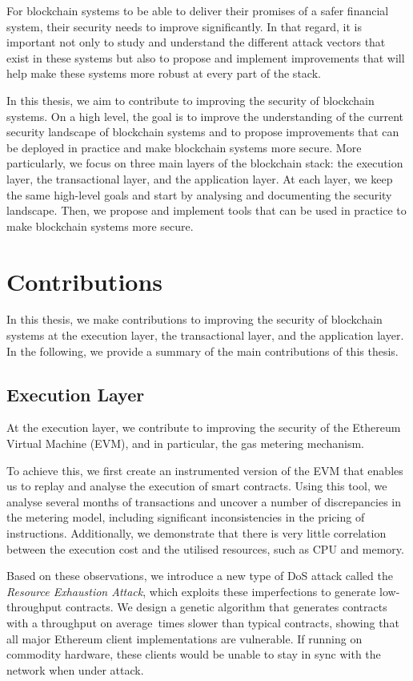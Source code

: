 For blockchain systems to be able to deliver their promises of a safer financial system, their security needs to improve significantly.
In that regard, it is important not only to study and understand the different attack vectors that exist in these systems but also to propose and implement improvements that will help make these systems more robust at every part of the stack.

In this thesis, we aim to contribute to improving the security of blockchain systems.
On a high level, the goal is to improve the understanding of the current security landscape of blockchain systems and to propose improvements that can be deployed in practice and make blockchain systems more secure.
More particularly, we focus on three main layers of the blockchain stack: the execution layer, the transactional layer, and the application layer.
At each layer, we keep the same high-level goals and start by analysing and documenting the security landscape.
Then, we propose and implement tools that can be used in practice to make blockchain systems more secure.

\section{Contributions}

In this thesis, we make contributions to improving the security of blockchain systems at the execution layer, the transactional layer, and the application layer.
In the following, we provide a summary of the main contributions of this thesis.

\subsection{Execution Layer}
At the execution layer, we contribute to improving the security of the Ethereum Virtual Machine (EVM), and in particular, the gas metering mechanism.

To achieve this, we first create an instrumented version of the EVM that enables us to replay and analyse the execution of smart contracts. Using this tool, we analyse several months of transactions and uncover a number of discrepancies in the metering model, including significant inconsistencies in the pricing of instructions. Additionally, we demonstrate that there is very little correlation between the execution cost and the utilised resources, such as CPU and memory.

Based on these observations, we introduce a new type of DoS attack called the \emph{Resource Exhaustion Attack}, which exploits these imperfections to generate low-throughput contracts. We design a genetic algorithm that generates contracts with a throughput on average~\Slowdown times slower than typical contracts, showing that all major Ethereum client implementations are vulnerable. If running on commodity hardware, these clients would be unable to stay in sync with the network when under attack.

